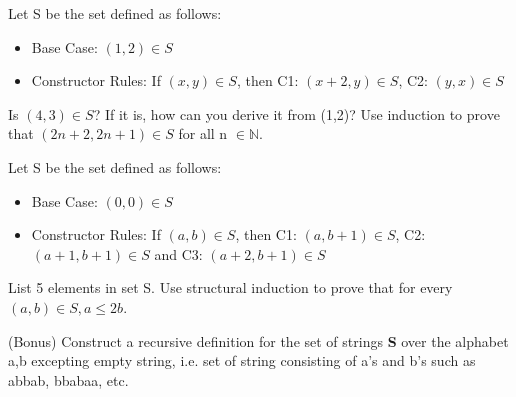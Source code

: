 \documentclass[solution, letterpaper]{cs20inclass}
\begin{document}
\problem Let S be the set defined as follows:
\begin{itemize}
\item Base Case: $(1,2) \in S$
\item Constructor Rules: If $(x,y)\in S$, then C1: $(x+2, y) \in S$, C2: $(y,x) \in S$ 
\end{itemize}
\subproblem Is $(4,3)\in S$? If it is, how can you derive it from (1,2)?
\subproblem Use induction to prove that $(2n+2, 2n+1)\in S$ for all n $\in \mathbb{N}$.
\pagebreak

\problem Let S be the set defined as follows:
\begin{itemize}
\item Base Case: $(0,0) \in S$
\item Constructor Rules: If $(a,b)\in S$, then C1: $(a, b+1) \in S$, C2: $(a+1,b+1)\in S$ and C3: $(a+2, b+1)\in S$ 
\end{itemize}
\subproblem List 5 elements in set S.
\subproblem Use structural induction to prove that for every $(a,b)\in S, a\leq 2b$.


\problem (Bonus) Construct a recursive definition for the set of strings \textbf{S} over the alphabet a,b excepting empty string, i.e. set of string consisting of a's and b's such as abbab, bbabaa, etc.
\end{document}

